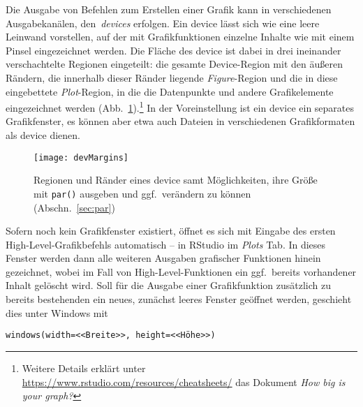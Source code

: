 Die Ausgabe von Befehlen zum Erstellen einer Grafik kann in verschiedenen Ausgabekanälen, den\ \emph{devices} erfolgen. Ein device lässt sich wie eine leere Leinwand vorstellen, auf der mit Grafikfunktionen einzelne Inhalte wie mit einem Pinsel eingezeichnet werden. Die Fläche des device ist dabei in drei ineinander verschachtelte Regionen eingeteilt: die gesamte Device-Region mit den äußeren Rändern, die innerhalb dieser Ränder liegende \emph{Figure}-Region und die in diese eingebettete \emph{Plot}-Region, in die die Datenpunkte und andere Grafikelemente eingezeichnet werden (Abb.\ \ref{fig:margins}).\footnote{Weitere Details erklärt unter \url{https://www.rstudio.com/resources/cheatsheets/} das Dokument \emph{How big is your graph?}} In der Voreinstellung ist ein device ein separates Grafikfenster, es können aber etwa auch Dateien in verschiedenen Grafikformaten als device dienen.

\begin{figure}[ht]
\centering
\texttt{[image: devMargins]}
\vspace*{-0.5em}
\caption{Regionen und Ränder eines device samt Möglichkeiten, ihre Größe mit \lstinline!par()! ausgeben und ggf.\ verändern zu können (Abschn.\ \ref{sec:par})}
\label{fig:margins}
\end{figure}

Sofern noch kein Grafikfenster existiert, öffnet es sich mit Eingabe des ersten High-Level-Grafikbefehls automatisch -- in RStudio im \emph{Plots} Tab. In dieses Fenster werden dann alle weiteren Ausgaben grafischer Funktionen hinein gezeichnet, wobei im Fall von High-Level-Funktionen ein ggf.\ bereits vorhandener Inhalt gelöscht wird. Soll für die Ausgabe einer Grafikfunktion zusätzlich zu bereits bestehenden ein neues, zunächst leeres Fenster geöffnet werden, geschieht dies unter Windows mit
\begin{lstlisting}
windows(width=<<Breite>>, height=<<Höhe>>)
\end{lstlisting}

